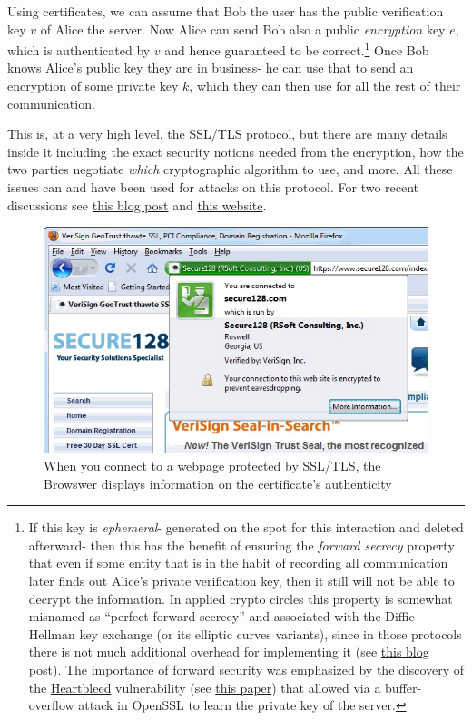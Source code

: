 Using certificates, we can assume that Bob the user has the public
verification key \(v\) of Alice the server. Now Alice can send Bob also
a public \emph{encryption} key \(e\), which is authenticated by \(v\)
and hence guaranteed to be correct.\footnote{If this key is
  \emph{ephemeral}- generated on the spot for this interaction and
  deleted afterward- then this has the benefit of ensuring the
  \emph{forward secrecy} property that even if some entity that is in
  the habit of recording all communication later finds out Alice's
  private verification key, then it still will not be able to decrypt
  the information. In applied crypto circles this property is somewhat
  misnamed as ``perfect forward secrecy'' and associated with the
  Diffie-Hellman key exchange (or its elliptic curves variants), since
  in those protocols there is not much additional overhead for
  implementing it (see
  \href{http://vincent.bernat.im/en/blog/2011-ssl-perfect-forward-secrecy.html}{this
  blog post}). The importance of forward security was emphasized by the
  discovery of the \href{http://heartbleed.com/}{Heartbleed}
  vulnerability (see
  \href{https://jhalderm.com/pub/papers/heartbleed-imc14.pdf}{this
  paper}) that allowed via a buffer-overflow attack in OpenSSL to learn
  the private key of the server.} Once Bob knows Alice's public key they
are in business- he can use that to send an encryption of some private
key \(k\), which they can then use for all the rest of their
communication.

This is, at a very high level, the SSL/TLS protocol, but there are many
details inside it including the exact security notions needed from the
encryption, how the two parties negotiate \emph{which} cryptographic
algorithm to use, and more. All these issues can and have been used for
attacks on this protocol. For two recent discussions see
\href{http://blog.cryptographyengineering.com/2013/12/how-does-nsa-break-ssl.html}{this
blog post} and \href{https://weakdh.org/}{this website}.

\begin{figure}
\centering
\includegraphics[width=\textwidth, height=0.25\paperheight, keepaspectratio]{../figure/certificate.jpg}
\caption{When you connect to a webpage protected by SSL/TLS, the
Browswer displays information on the certificate's authenticity}
\label{tmplabelfig}
\end{figure}

